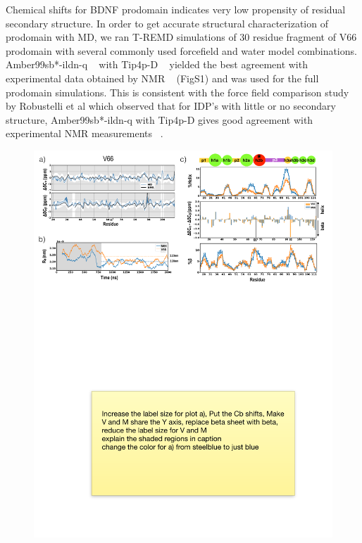 \documentclass[journal=jacsat,manuscript=article]{achemso}
\begin{document}
Chemical shifts for BDNF prodomain indicates very low propensity of residual secondary structure. In order to get accurate structural characterization of prodomain with MD,  we ran T-REMD simulations of 30 residue fragment of V66 prodomain with several commonly used forcefield and water model combinations. Amber99sb*-ildn-q ~\cite{Lindorff-Larsen2010a, Hornak2006a} with Tip4p-D ~\cite {Piana2015} yielded the best agreement with experimental data obtained by NMR ~\cite{Anastasia2013} (FigS1) and was used for the full prodomain simulations. This is consistent with the force field comparison study by Robustelli et al which observed that for IDP's with little or no secondary structure,  Amber99sb*-ildn-q with Tip4p-D gives good agreement with experimental NMR measurements ~\cite {Robustelli2018}.
\begin{figure}[!ht]
\includegraphics[scale=0.5,width=\textwidth,trim={0 0cm 0 0cm},clip]{../figures/fig2.pdf}

\end{figure}
\end{document}

